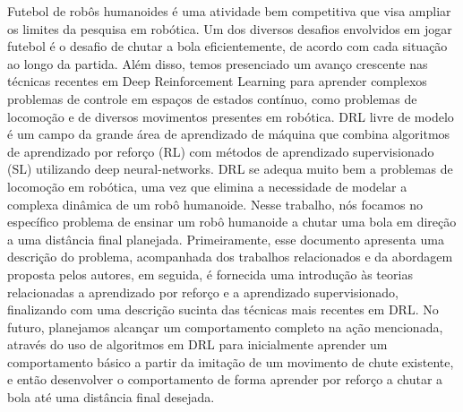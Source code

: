 
Futebol de rob\^os humanoides \'e uma atividade bem competitiva que visa ampliar os limites da pesquisa em rob\'otica. Um dos diversos desafios envolvidos em jogar futebol \'e o desafio de chutar a bola eficientemente, de acordo com cada situa\c c\~ao ao longo da partida. Al\'em disso, temos presenciado um avan\c co crescente nas t\'ecnicas recentes em Deep Reinforcement Learning para aprender complexos problemas de controle em espa\c cos de estados cont\'inuo, como problemas de locomo\c c\~ao e de diversos movimentos presentes em rob\'otica. DRL livre de modelo \'e um campo da grande \'area de aprendizado de m\'aquina que combina algoritmos de aprendizado por refor\c co (RL) com m\'etodos de aprendizado supervisionado (SL) utilizando deep neural-networks. DRL se adequa muito bem a problemas de locomo\c c\~ao em rob\'otica, uma vez que elimina a necessidade de modelar a complexa din\^amica de um rob\^o humanoide. Nesse trabalho, n\'os focamos no espec\'ifico problema de ensinar um rob\^o humanoide a chutar uma bola em dire\c c\~ao a uma dist\^ancia final planejada. Primeiramente, esse documento apresenta uma descri\c c\~ao do problema, acompanhada dos trabalhos relacionados e da abordagem proposta pelos autores, em seguida, \'e fornecida uma introdu\c c\~ao \`as teorias relacionadas a aprendizado por refor\c co e a aprendizado supervisionado, finalizando com uma descri\c c\~ao sucinta das t\'ecnicas mais recentes em DRL. No futuro, planejamos alcan\c car um comportamento completo na a\c c\~ao mencionada, atrav\'es do uso de algoritmos em DRL para inicialmente aprender um comportamento b\'asico a partir da imita\c c\~ao de um movimento de chute existente, e ent\~ao desenvolver o comportamento de forma aprender por refor\c co a chutar a bola at\'e uma dist\^ancia final desejada.

